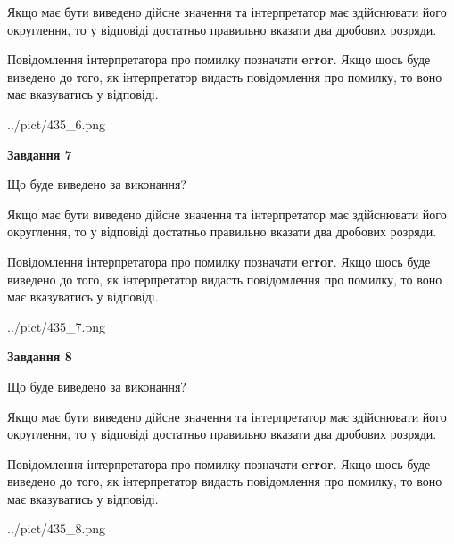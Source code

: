 \documentclass[12pt, ukrainian]{article}
\begin{document}
{\begin {Large}
Якщо має бути виведено дійсне значення та інтерпретатор має здійснювати його округлення, 
то у відповіді достатньо правильно вказати два дробових розряди.

Повідомлення інтерпретатора про помилку позначати \textbf{error}.
Якщо щось буде виведено до того, як інтерпретатор видасть повідомлення про помилку, 
то воно має вказуватись у відповіді. \par

\begin{center}
	{../pict/435_6.png}
\end{center}
\newpage

{\begin {center}\textbf{Завдання 7}\end {center}}\par
Що буде виведено за виконання? \par

Якщо має бути виведено дійсне значення та інтерпретатор має здійснювати його округлення, 
то у відповіді достатньо правильно вказати два дробових розряди.

Повідомлення інтерпретатора про помилку позначати \textbf{error}.
Якщо щось буде виведено до того, як інтерпретатор видасть повідомлення про помилку, 
то воно має вказуватись у відповіді. \par

\begin{center}
	{../pict/435_7.png}
\end{center}
\newpage

{\begin {center}\textbf{Завдання 8}\end {center}}\par
Що буде виведено за виконання? \par

Якщо має бути виведено дійсне значення та інтерпретатор має здійснювати його округлення, 
то у відповіді достатньо правильно вказати два дробових розряди.

Повідомлення інтерпретатора про помилку позначати \textbf{error}.
Якщо щось буде виведено до того, як інтерпретатор видасть повідомлення про помилку, 
то воно має вказуватись у відповіді. \par

\begin{center}
	{../pict/435_8.png}
\end{center}
\newpage


\end{Large}}
\end{document}
